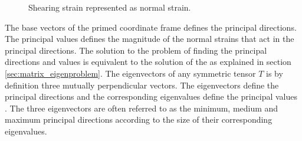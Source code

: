 \begin{figure}
  \centering
  \caption{Shearing strain represented as normal strain.}
  \label{fig:principal_direction}
\end{figure}


The base vectors of the primed coordinate frame
defines the principal directions. The principal values defines the
magnitude of the normal strains that act in the principal directions. 
The solution to the problem of finding the principal directions and values
is equivalent to the solution of the  as explained
in section \vref{sec:matrix_eigenproblem}. 
%
The eigenvectors of any symmetric tensor
$T$ is by definition three mutually perpendicular vectors. The
eigenvectors define the
principal directions and the corresponding 
eigenvalues define the principal values . 
The three eigenvectors are often referred to as the minimum, medium
and maximum principal directions according to the size of their
corresponding eigenvalues. \\


